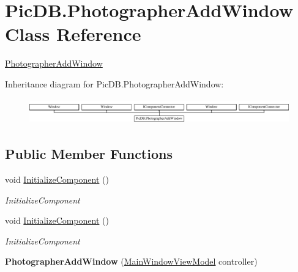 \hypertarget{class_pic_d_b_1_1_photographer_add_window}{}\section{Pic\+D\+B.\+Photographer\+Add\+Window Class Reference}
\label{class_pic_d_b_1_1_photographer_add_window}


\mbox{\hyperlink{class_pic_d_b_1_1_photographer_add_window}{Photographer\+Add\+Window}}  


Inheritance diagram for Pic\+D\+B.\+Photographer\+Add\+Window\+:\begin{figure}[H]
\begin{center}
\leavevmode
\includegraphics[height=1.103448cm]{class_pic_d_b_1_1_photographer_add_window}
\end{center}
\end{figure}
\subsection*{Public Member Functions}
\begin{DoxyCompactItemize}
\item 
void \mbox{\hyperlink{class_pic_d_b_1_1_photographer_add_window_aec66b53da5fcb2256a53b1c51144fcbe}{Initialize\+Component}} ()
\begin{DoxyCompactList}\small\item\em Initialize\+Component \end{DoxyCompactList}\item 
void \mbox{\hyperlink{class_pic_d_b_1_1_photographer_add_window_aec66b53da5fcb2256a53b1c51144fcbe}{Initialize\+Component}} ()
\begin{DoxyCompactList}\small\item\em Initialize\+Component \end{DoxyCompactList}\item 
\mbox{\label{class_pic_d_b_1_1_photographer_add_window_aba19418c2227fb9383e02bf10123a4c2}} 
{\bfseries Photographer\+Add\+Window} (\mbox{\hyperlink{class_pic_d_b_1_1_view_models_1_1_main_window_view_model}{Main\+Window\+View\+Model}} controller)
\end{DoxyCompactItemize}


